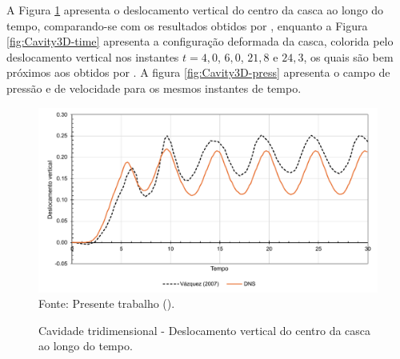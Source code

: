 A Figura \ref{fig:Cavity3D-res} apresenta o deslocamento vertical do centro da casca ao longo do tempo, comparando-se com os resultados obtidos por , enquanto a Figura \ref{fig:Cavity3D-time} apresenta a configuração deformada da casca, colorida pelo deslocamento vertical nos instantes $t=4,0$, $6,0$, $21,8$ e $24,3$, os quais são bem próximos aos obtidos por . A figura \ref{fig:Cavity3D-press} apresenta o campo de pressão e de velocidade para os mesmos instantes de tempo.

\begin{figure}[h!]
    \centering
    \caption{Cavidade tridimensional - Deslocamento vertical do centro da casca ao longo do tempo.}
    \includegraphics[width=\linewidth]{Figuras/FSI-Cavity3D/vert_disp.pdf}
    \\Fonte: Presente trabalho (\the\year).
    \label{fig:Cavity3D-res}
\end{figure}

